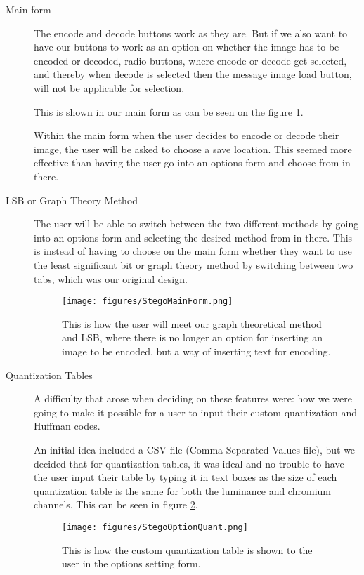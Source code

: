 \begin{description}
\item[Main form]
The encode and decode buttons work as they are.
But if we also want to have our buttons to work as an option on whether the image has to be encoded or decoded, radio buttons, where encode or decode get selected, and thereby when decode is selected then the message image load button, will not be applicable for selection.

This is shown in our main form as can be seen on the figure \ref{fig:StegoMainForm}.

Within the main form when the user decides to encode or decode their image, the user will be asked to choose a save location. This seemed more effective than having the user go into an options form and choose from in there.

\item[LSB or Graph Theory Method]
The user will be able to switch between the two different methods by going into an options form and selecting the desired method from in there. This is instead of having to choose on the main form whether they want to use the least significant bit or graph theory method by switching between two tabs, which was our original design.

\begin{figure}
	\centering
	\texttt{[image: figures/StegoMainForm.png]}
	\caption{This is how the user will meet our graph theoretical method and LSB, where there is no longer an option for inserting an image to be encoded, but a way of inserting text for encoding.}
	\label{fig:StegoMainForm}
\end{figure}

\item[Quantization Tables]
A difficulty that arose when deciding on these features were: how we were going to make it possible for a user to input their custom quantization and Huffman codes.

An initial idea included a CSV-file (Comma Separated Values file), but we decided that for quantization tables, it was ideal and no trouble to have the user input their table by typing it in text boxes as the size of each quantization table is the same for both the luminance and chromium channels. This can be seen in figure \ref{fig:StegoOptionQuant}.


\begin{figure}
	\centering
	\texttt{[image: figures/StegoOptionQuant.png]}
	\caption{This is how the custom quantization table is shown to the user in the options setting form.}
	\label{fig:StegoOptionQuant}
\end{figure}


\end{description}
